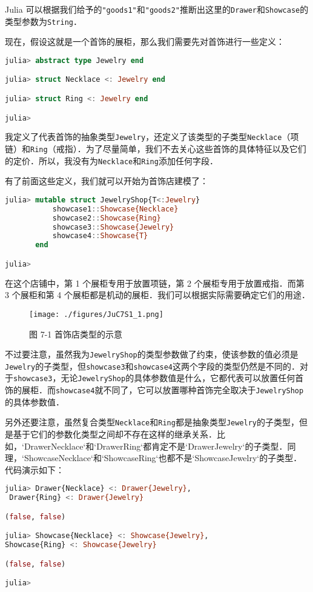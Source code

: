 Julia 可以根据我们给予的\verb|"goods1"|和\verb|"goods2"|推断出这里的\verb|Drawer|和\verb|Showcase|的类型参数为\verb|String|．

现在，假设这就是一个首饰的展柜，那么我们需要先对首饰进行一些定义：
\begin{lstlisting}[language=julia]
julia> abstract type Jewelry end

julia> struct Necklace <: Jewelry end

julia> struct Ring <: Jewelry end

julia> 
\end{lstlisting}

我定义了代表首饰的抽象类型\verb|Jewelry|，还定义了该类型的子类型\verb|Necklace|（项链）和\verb|Ring|（戒指）．为了尽量简单，我们不去关心这些首饰的具体特征以及它们的定价．所以，我没有为\verb|Necklace|和\verb|Ring|添加任何字段．

有了前面这些定义，我们就可以开始为首饰店建模了：
\begin{lstlisting}[language=julia]
julia> mutable struct JewelryShop{T<:Jewelry}
           showcase1::Showcase{Necklace}
           showcase2::Showcase{Ring}
           showcase3::Showcase{Jewelry}
           showcase4::Showcase{T}
       end

julia> 
\end{lstlisting}

在这个店铺中，第 1 个展柜专用于放置项链，第 2 个展柜专用于放置戒指．而第 3 个展柜和第 4 个展柜都是机动的展柜．我们可以根据实际需要确定它们的用途．
\begin{figure}[ht]
\centering
\texttt{[image: ./figures/JuC7S1\_1.png]}
\caption{图 7-1 首饰店类型的示意} \label{JuC7S1_fig1}
\end{figure}

不过要注意，虽然我为\verb|JewelryShop|的类型参数做了约束，使该参数的值必须是\verb|Jewelry|的子类型，但\verb|showcase3|和\verb|showcase4|这两个字段的类型仍然是不同的．对于\verb|showcase3|，无论\verb|JewelryShop|的具体参数值是什么，它都代表可以放置任何首饰的展柜．而\verb|showcase4|就不同了，它可以放置哪种首饰完全取决于\verb|JewelryShop|的具体参数值．

另外还要注意，虽然复合类型\verb|Necklace|和\verb|Ring|都是抽象类型\verb|Jewelry|的子类型，但是基于它们的参数化类型之间却不存在这样的继承关系．比如，`Drawer{Necklace}`和`Drawer{Ring}`都肯定不是`Drawer{Jewelry}`的子类型．同理，`Showcase{Necklace}`和`Showcase{Ring}`也都不是`Showcase{Jewelry}`的子类型．代码演示如下：

\begin{lstlisting}[language=julia]
julia> Drawer{Necklace} <: Drawer{Jewelry},
 Drawer{Ring} <: Drawer{Jewelry}

(false, false)

julia> Showcase{Necklace} <: Showcase{Jewelry}, 
Showcase{Ring} <: Showcase{Jewelry}

(false, false)

julia> 
\end{lstlisting}

